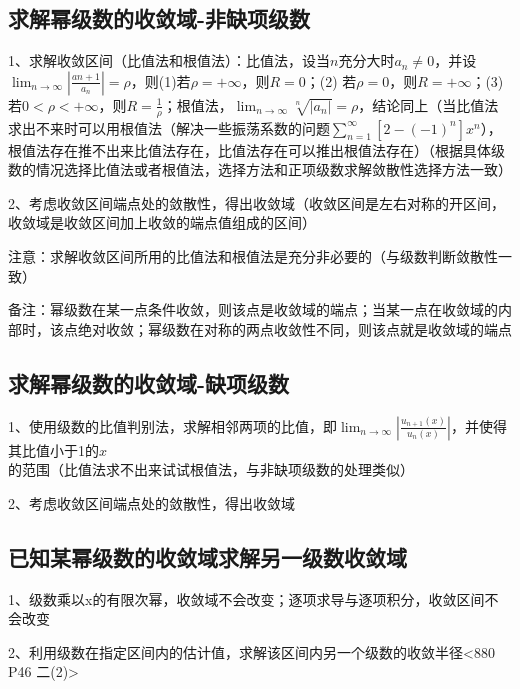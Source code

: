 \subsection{求解幂级数的收敛域-非缺项级数}

1、求解收敛区间（比值法和根值法）：比值法，设当$n$充分大时$a_{n} \neq 0$，并设$\lim_{n \rightarrow \infty}\left|\frac{a{n+1}}{a_{n}}\right|=\rho$，则(1)若$\rho=+\infty$，则$R=0$；(2) 若$\rho=0$，则$R=+\infty$；(3) 若$0<\rho<+\infty$，则$R=\frac{1}{\rho}$；根值法，$\lim_{n \rightarrow \infty} \sqrt[n]{\mid a_{n} |}=\rho$，结论同上（当比值法求出不来时可以用根值法（解决一些振荡系数的问题$\sum_{n=1}^{\infty}\left[2-(-1)^{n}\right] x^{n}$），根值法存在推不出来比值法存在，比值法存在可以推出根值法存在）（根据具体级数的情况选择比值法或者根值法，选择方法和正项级数求解敛散性选择方法一致）

2、考虑收敛区间端点处的敛散性，得出收敛域（收敛区间是左右对称的开区间，收敛域是收敛区间加上收敛的端点值组成的区间）

注意：求解收敛区间所用的比值法和根值法是充分非必要的（与级数判断敛散性一致）

备注：幂级数在某一点条件收敛，则该点是收敛域的端点；当某一点在收敛域的内部时，该点绝对收敛；幂级数在对称的两点收敛性不同，则该点就是收敛域的端点



\subsection{求解幂级数的收敛域-缺项级数}

1、使用级数的比值判别法，求解相邻两项的比值，即$\lim _{n \rightarrow \infty}\left|\frac{u_{n+1}(x)}{u_{n}(x)}\right|$，并使得其比值小于1的$x$的范围（比值法求不出来试试根值法，与非缺项级数的处理类似）

2、考虑收敛区间端点处的敛散性，得出收敛域



\subsection{已知某幂级数的收敛域求解另一级数收敛域}

1、级数乘以x的有限次幂，收敛域不会改变；逐项求导与逐项积分，收敛区间不会改变

2、利用级数在指定区间内的估计值，求解该区间内另一个级数的收敛半径<880 P46 二(2)>



